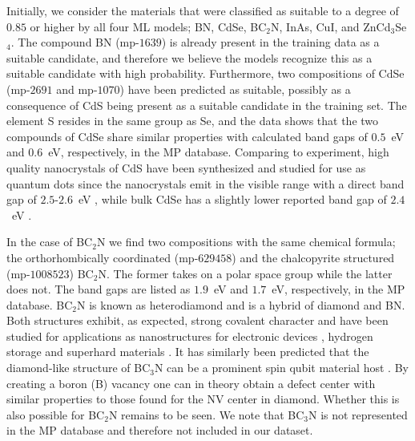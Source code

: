 \documentclass[superscriptaddress,unsortedaddress,
 amsmath,amssymb,
 aps,
]{revtex4-2}
\begin{document}
Initially, we consider the materials that were classified as suitable to a degree of $0.85$ or higher by all four ML models; BN, CdSe, BC$_2$N, InAs, CuI, and ZnCd$_3$Se$_4$. 
The compound BN (mp-$1639$) is already present in the training data as a suitable candidate, and therefore we believe the models recognize this as a suitable candidate with high probability. Furthermore, two compositions of CdSe (mp-$2691$ and mp-$1070$) have been predicted as suitable, possibly as a consequence of CdS being present as a suitable candidate in the training set. The element S resides in the same group as Se, and the data shows that the two compounds of CdSe share similar properties with calculated band gaps of $0.5$~eV and $0.6$~eV, respectively, in the MP database. 
Comparing to experiment, high quality nanocrystals of CdS have been synthesized and studied for use as quantum dots since the nanocrystals emit in the visible range with a direct band gap of $2.5$-$2.6$~eV \cite{BanerjeeR2000Eots,CelebiSerdar2007SaCo,Qutub2012}, while bulk CdSe has a slightly lower reported band gap of $2.4$~eV \cite{Qutub2012}.  

In the case of BC$_2$N we find two compositions with the same chemical formula; the orthorhombically coordinated (mp-$629458$) and the chalcopyrite structured (mp-$1008523$) BC$_2$N. The former takes on a polar space group while the latter does not. The band gaps are listed as $1.9$~eV and $1.7$~eV, respectively, in the MP database. BC$_2$N is known as heterodiamond and is a hybrid of diamond and BN. Both structures exhibit, as expected, strong covalent character and have been studied for applications as nanostructures for electronic devices \cite{Gao2017}, hydrogen storage \cite{Cai2017} and superhard materials \cite{Li2017, Jiang2020}. It has similarly been predicted that the diamond-like structure of BC$_3$N can be a prominent spin qubit material host \cite{Wang2020SpinQB}. By creating a boron (B) vacancy one can in theory obtain a defect center with similar properties to those found for the NV center in diamond. Whether this is also possible for BC$_2$N remains to be seen. We note that BC$_3$N is not represented in the MP database and therefore not included in our dataset. 
\end{document}
